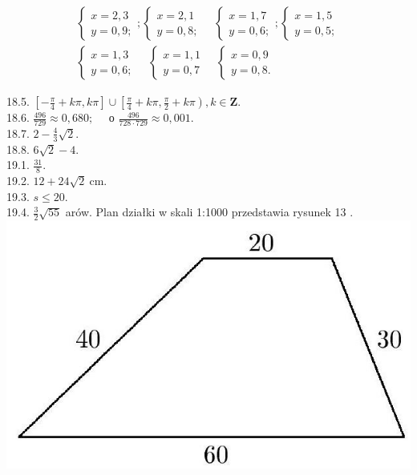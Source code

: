 \documentclass[10pt]{article}
\begin{document}
$$
\begin{gathered}
\left\{\begin{array}{l}
x=2,3 \\
y=0,9 ;
\end{array} ;\left\{\begin{array} { l } 
{ x = 2 , 1 } \\
{ y = 0 , 8 ; }
\end{array} \quad \left\{\begin{array}{l}
x=1,7 \\
y=0,6 ;
\end{array} ;\left\{\begin{array}{l}
x=1,5 \\
y=0,5 ;
\end{array}\right.\right.\right.\right. \\
\left\{\begin{array} { l } 
{ x = 1 , 3 } \\
{ y = 0 , 6 ; }
\end{array} \quad \left\{\begin{array} { l } 
{ x = 1 , 1 } \\
{ y = 0 , 7 }
\end{array} \quad \left\{\begin{array}{l}
x=0,9 \\
y=0,8 .
\end{array}\right.\right.\right.
\end{gathered}
$$

18.5. $\left[-\frac{\pi}{4}+k \pi, k \pi\right] \cup\left[\frac{\pi}{4}+k \pi, \frac{\pi}{2}+k \pi\right), k \in \mathbf{Z}$.\\
18.6. $\frac{496}{729} \approx 0,680 ; \quad$ о $\frac{496}{728 \cdot 729} \approx 0,001$.\\
18.7. $2-\frac{4}{3} \sqrt{2}$.\\
18.8. $6 \sqrt{2}-4$.\\
19.1. $\frac{31}{8}$.\\
19.2. $12+24 \sqrt{2} \mathrm{~cm}$.\\
19.3. $s \leq 20$.\\
19.4. $\frac{3}{2} \sqrt{55}$ arów. Plan działki w skali 1:1000 przedstawia rysunek 13 .\\
\includegraphics[max width=\textwidth, center]{2024_11_16_fe5b564401bf7db98894g-067}
\end{document}
